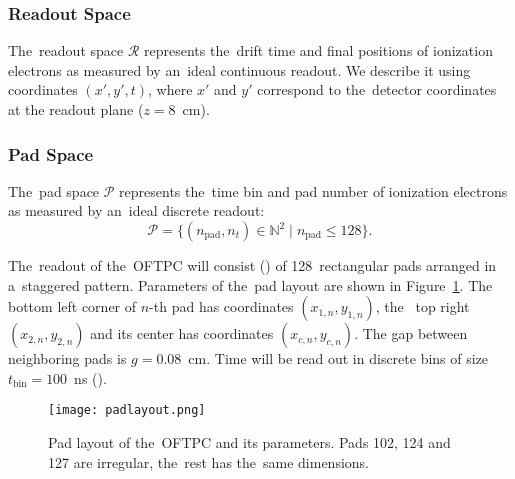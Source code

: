 			\subsubsection{Readout Space}
				The~readout space $\mathcal{R}$ represents the~drift time and final positions of ionization electrons as measured by an~ideal continuous readout. We describe it using coordinates $(x',y',t)$, where $x'$ and $y'$ correspond to the~detector coordinates at the readout plane ($z = 8$~cm).
				
			
			\subsubsection{Pad Space}
				The~pad space $\mathcal{P}$ represents the~time bin and pad number of ionization electrons as measured by an~ideal discrete readout:
					\begin{equation}
						\mathcal{P} = \{(n_\text{pad},n_t)\in\mathbb{N}^2 \mid n_\text{pad}\leq128\}.
					\end{equation}
				
				The~readout of the~\ac{OFTPC} will consist () of 128~rectangular pads arranged in a~staggered pattern. Parameters of the~pad layout are shown in Figure~\ref{fig:padlayout}. The bottom left corner of $n$\nobreakdash-th pad has coordinates $(x_{1,n},y_{1,n})$, the~ top right $(x_{2,n},y_{2,n})$ and its center has coordinates $(x_{c,n},y_{c,n})$. The gap between neighboring pads is $g=0.08$~cm. Time will be read out in discrete bins of size $t_\text{bin}=100$~ns (). 
			
				\begin{figure}[H]
					\centering
					\texttt{[image: padlayout.png]}
					\caption{Pad layout of the~\ac{OFTPC} and its parameters. Pads 102, 124 and 127 are irregular, the~rest has the~same dimensions.}
					\label{fig:padlayout}
				\end{figure}
		
